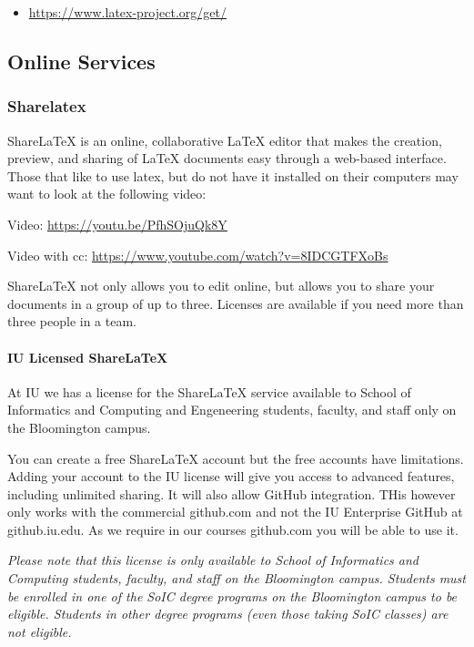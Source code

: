 \begin{itemize}

\item
  \url{https://www.latex-project.org/get/}
\end{itemize}

\subsection{Online Services}\label{online-services}

\subsubsection{Sharelatex}\label{sharelatex}

ShareLaTeX is an online, collaborative LaTeX editor that makes the
creation, preview, and sharing of LaTeX documents easy through a
web-based interface.  Those that like to use latex, but do not have it
installed on their computers may want to look at the following video:

Video: \url{https://youtu.be/PfhSOjuQk8Y}

Video with cc: \url{https://www.youtube.com/watch?v=8IDCGTFXoBs}

ShareLaTeX not only allows you to edit online, but allows you to share
your documents in a group of up to three. Licenses are available if you
need more than three people in a team.

\paragraph{IU Licensed ShareLaTeX}

At IU we has a license for the ShareLaTeX service available to School
of Informatics and Computing and Engeneering students, faculty, and
staff only on the Bloomington campus.  

You can create a free ShareLaTeX account but the free accounts have
limitations.  Adding your account to the IU license will give you access
to advanced features, including unlimited sharing.  
It will also allow GitHub integration. THis however only works with
the commercial github.com and not the IU Enterprise GitHub at
github.iu.edu. As we require in our courses github.com you will be
able to use it.

{\em Please note that this license is only available to School of
Informatics and Computing students, faculty, and staff on the
Bloomington campus.  Students must be enrolled in one of the SoIC
degree programs on the Bloomington campus to be eligible.  Students in
other degree programs (even those taking SoIC classes) are not
eligible.}



